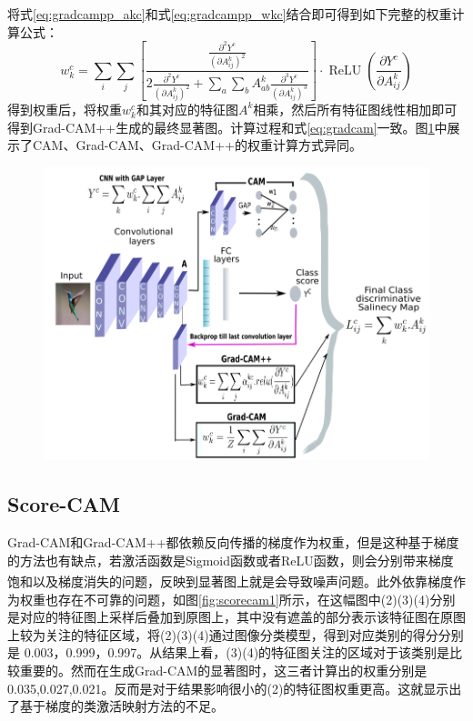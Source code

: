 将式\ref{eq:gradcampp_akc}和式\ref{eq:gradcampp_wkc}结合即可得到如下完整的权重计算公式：
\begin{equation}
	w_{k}^{c}=\sum_{i} \sum_{j}\left[\frac{\frac{\partial^{2} Y^{c}}{\left(\partial A_{i j}^{k}\right)^{2}}}{2 \frac{\partial^{2} Y^{c}}{\left(\partial A_{i j}^{k}\right)^{2}}+\sum_{a} \sum_{b} A_{a b}^{k}\frac{\partial^{3} Y^{c}}{\left(\partial A_{i j}^{k}\right)^{3}}}\right] \cdot \operatorname{ReLU}\left(\frac{\partial Y^{c}}{\partial A_{i j}^{k}}\right)
\end{equation}
得到权重后，将权重$w_{k}^{c}$和其对应的特征图$A^k$相乘，然后所有特征图线性相加即可得到Grad-CAM++生成的最终显著图。计算过程和式\ref{eq:gradcam}一致。图\ref{fig:gradcampp2}中展示了CAM、Grad-CAM、Grad-CAM++的权重计算方式异同。
\begin{figure}[h]
	\centering 
	\includegraphics[width=12cm]{fig/ch2/gradcampp2.png}
	\label{fig:gradcampp2}
\end{figure}

\subsection{Score-CAM}
Grad-CAM和Grad-CAM++都依赖反向传播的梯度作为权重，但是这种基于梯度的方法也有缺点，若激活函数是Sigmoid函数或者ReLU函数，则会分别带来梯度饱和以及梯度消失的问题\textsuperscript{\cite{simonyan2014visualising}}，反映到显著图上就是会导致噪声问题。此外依靠梯度作为权重也存在不可靠的问题，如图\ref{fig:scorecam1}所示，在这幅图中(2)(3)(4)分别是对应的特征图上采样后叠加到原图上，其中没有遮盖的部分表示该特征图在原图上较为关注的特征区域，将(2)(3)(4)通过图像分类模型，得到对应类别的得分分别是 0.003，0.999，0.997。从结果上看，(3)(4)的特征图关注的区域对于该类别是比较重要的。然而在生成Grad-CAM的显著图时，这三者计算出的权重分别是0.035,0.027,0.021。反而是对于结果影响很小的(2)的特征图权重更高。这就显示出了基于梯度的类激活映射方法的不足。


